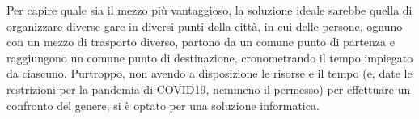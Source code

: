 Per capire quale sia il mezzo più vantaggioso, la soluzione ideale sarebbe quella di organizzare diverse gare in diversi punti della città, in cui delle persone, ognuno con un mezzo di trasporto diverso, partono da un comune punto di partenza e raggiungono un comune punto di destinazione, cronometrando il tempo impiegato da ciascuno. Purtroppo, non avendo a disposizione le risorse e il tempo (e, date le restrizioni per la pandemia di COVID19, nemmeno il permesso) per effettuare un confronto del genere, si è optato per una soluzione informatica.

